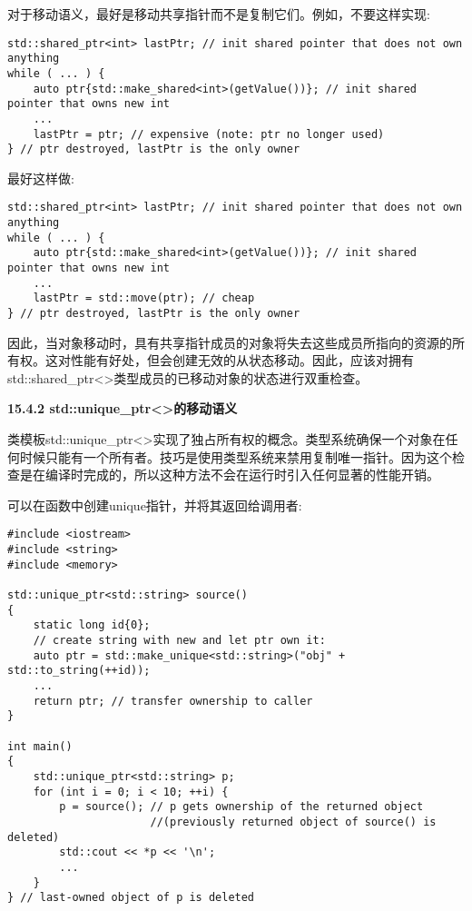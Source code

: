 对于移动语义，最好是移动共享指针而不是复制它们。例如，不要这样实现:\par

\begin{lstlisting}[caption={}]
std::shared_ptr<int> lastPtr; // init shared pointer that does not own anything
while ( ... ) {
	auto ptr{std::make_shared<int>(getValue())}; // init shared pointer that owns new int
	...
	lastPtr = ptr; // expensive (note: ptr no longer used)
} // ptr destroyed, lastPtr is the only owner
\end{lstlisting}

最好这样做:\par

\begin{lstlisting}[caption={}]
std::shared_ptr<int> lastPtr; // init shared pointer that does not own anything
while ( ... ) {
	auto ptr{std::make_shared<int>(getValue())}; // init shared pointer that owns new int
	...
	lastPtr = std::move(ptr); // cheap
} // ptr destroyed, lastPtr is the only owner
\end{lstlisting}

因此，当对象移动时，具有共享指针成员的对象将失去这些成员所指向的资源的所有权。这对性能有好处，但会创建无效的从状态移动。因此，应该对拥有std::shared\_ptr<>类型成员的已移动对象的状态进行双重检查。\par

\hspace*{\fill} \par %
\textbf{15.4.2 std::unique\_ptr<>的移动语义}

类模板std::unique\_ptr<>实现了独占所有权的概念。类型系统确保一个对象在任何时候只能有一个所有者。技巧是使用类型系统来禁用复制唯一指针。因为这个检查是在编译时完成的，所以这种方法不会在运行时引入任何显著的性能开销。\par

可以在函数中创建unique指针，并将其返回给调用者:\par

{\color{red}{lib/uniqueptr1.cpp}}\par

\begin{lstlisting}[caption={}]
#include <iostream>
#include <string>
#include <memory>

std::unique_ptr<std::string> source()
{
	static long id{0};
	// create string with new and let ptr own it:
	auto ptr = std::make_unique<std::string>("obj" + std::to_string(++id));
	...
	return ptr; // transfer ownership to caller
}

int main()
{
	std::unique_ptr<std::string> p;
	for (int i = 0; i < 10; ++i) {
		p = source(); // p gets ownership of the returned object
		              //(previously returned object of source() is deleted)
		std::cout << *p << '\n';
		...
	}
} // last-owned object of p is deleted
\end{lstlisting}

